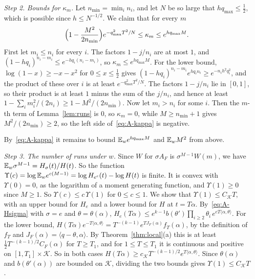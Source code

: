 \emph{Step 2. Bounds for $\kappa_m$.} Let $n_{\min}=\min_in_i$, and let $N$ be so large that $hq_{\max}\le\frac12$, which is possible since $h\le N^{-1/2}$. We claim that
for every $m$
\begin{equation}\label{eq:A-kappa}
\Bigl(1-\frac{M^2}{2n_{\min}}\Bigr)e^{-q_{\max}^2T^2/N}\le\kappa_m\le
e^{hq_{\max}M}.
\end{equation}
First let $m_i\le n_i$ for every $i$. The factors $1-j/n_i$ are at most $1$,
and $(1-hq_i)^{n_i-m_i}\le e^{-hq_i(n_i-m_i)}$, so
$\kappa_m\le e^{hq_{\max}M}$. For the lower bound,
$\log(1-x)\ge-x-x^2$ for $0\le x\le\frac12$ gives
$(1-hq_i)^{n_i-m_i}e^{hq_in_i}\ge e^{-n_ih^2q_i^2}$, and the product of these
over $i$ is at least $e^{-q_{\max}^2T^2/N}$. The factors $1-j/n_i$ lie in
$[0,1]$, so their product is at least $1$ minus the sum of the $j/n_i$, and
hence at least $1-\sum_im_i^2/(2n_i)\ge1-M^2/(2n_{\min})$. Now let
$m_i>n_i$ for some $i$. Then the $m$-th term of Lemma~\ref{lem:runs} is $0$, so $\kappa_m=0$, while $M\ge n_{\min}+1$ gives
$M^2/(2n_{\min})\ge2$, so the left side of~\eqref{eq:A-kappa} is negative.

By~\eqref{eq:A-kappa} it remains to bound $\mathbb{E}_we^{hq_{\max}M}$ and
$\mathbb{E}_wM^2$ from above.

\emph{Step 3. The number of runs under $w$.} Since $W$ for $\sigma A_F$ is
$\sigma^{M-1}W(m)$, we have $\mathbb{E}_w\sigma^{M-1}=H_\sigma(t)/H(t)$. So the
function $\Upsilon(c)=\log\mathbb{E}_we^{c(M-1)}=\log H_{e^c}(t)-\log H(t)$ is finite. It
is convex with $\Upsilon(0)=0$, as the logarithm of a moment generating function,
and $\Upsilon(1)\ge0$ since $M\ge1$. So $\Upsilon(c)\le c\,\Upsilon(1)$ for $0\le c\le1$.
We show that $\Upsilon(1)\le C_{\mathcal K}T$, with an upper bound for $H_e$ and
a lower bound for $H$ at $t=T\alpha$. By~\eqref{eq:A-Hsigma} with $\sigma=e$
and $\theta=\theta(\alpha)$,
$H_e(T\alpha)\le e^{k-1}b(\theta')\prod_{i\ge2}\theta_i\,
e^{eT\langle\alpha,\theta\rangle}$. For the lower bound,
$H(T\alpha)e^{-T\langle\alpha,\theta\rangle}=T^{-(k-1)}e^{TJ_F(\alpha)}f_T(\alpha)$,
by the definition of $f_T$ and $J_F(\alpha)=\langle q-\theta,\alpha\rangle$.
By Theorem~\ref{thm:local}(a) this is at least
$\frac12T^{-(k-1)/2}C_F(\alpha)$ for $T\ge T_1$, and for $1\le T\le T_1$ it is
continuous and positive on $[1,T_1]\times\mathcal K$. So in both cases
$H(T\alpha)\ge c_{\mathcal K}T^{-(k-1)/2}e^{T\langle\alpha,\theta\rangle}$.
Since $\theta(\alpha)$ and $b(\theta'(\alpha))$ are bounded on $\mathcal K$,
dividing the two bounds gives $\Upsilon(1)\le C_{\mathcal K}T$.

